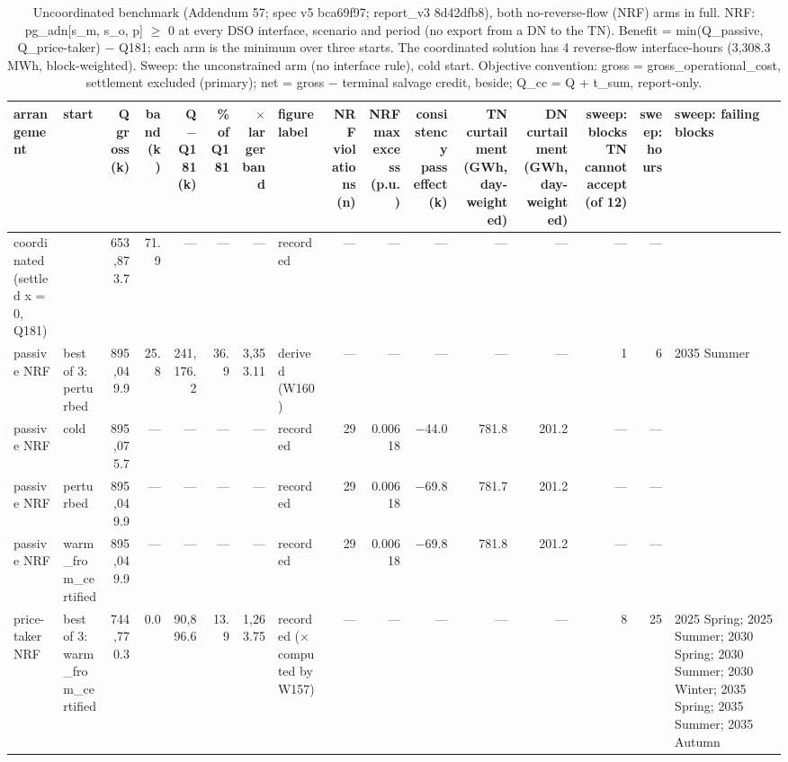 \begin{table}[htbp]
\centering
\scriptsize
\caption{Uncoordinated benchmark (Addendum 57; spec v5 bca69f97; report\_v3 8d42dfb8), both no-reverse-flow (NRF) arms in full. NRF: pg\_adn[s\_m, s\_o, p] $\geq$ 0 at every DSO interface, scenario and period (no export from a DN to the TN). Benefit = min(Q\_passive, Q\_price-taker) $-$ Q181; each arm is the minimum over three starts. The coordinated solution has 4 reverse-flow interface-hours (3,308.3 MWh, block-weighted). Sweep: the unconstrained arm (no interface rule), cold start. Objective convention: gross = gross\_operational\_cost, settlement excluded (primary); net = gross $-$ terminal salvage credit, beside; Q\_cc = Q + t\_sum, report-only.}
\label{tab:T6}
\begin{tabular}{llrrrrrlrrrrrrrl}
\toprule
arrangement & start & Q gross (k\texteuro{}) & band (k\texteuro{}) & Q $-$ Q181 (k\texteuro{}) & \% of Q181 & $\times$ larger band & figure label & NRF violations (n) & NRF max excess (p.u.) & consistency pass effect (k\texteuro{}) & TN curtailment (GWh, day-weighted) & DN curtailment (GWh, day-weighted) & sweep: blocks TN cannot accept (of 12) & sweep: hours & sweep: failing blocks \\
\midrule
coordinated (settled x = 0, Q181) &  & 653,873.7 & 71.9 & --- & --- & --- & recorded & --- & --- & --- & --- & --- & --- & --- &  \\
passive NRF & best of 3: perturbed & 895,049.9 & 25.8 & 241,176.2 & 36.9 & 3,353.11 & derived (W160) & --- & --- & --- & --- & --- & 1 & 6 & 2035 Summer \\
passive NRF & cold & 895,075.7 & --- & --- & --- & --- & recorded & 29 & 0.00618 & $-$44.0 & 781.8 & 201.2 & --- & --- &  \\
passive NRF & perturbed & 895,049.9 & --- & --- & --- & --- & recorded & 29 & 0.00618 & $-$69.8 & 781.7 & 201.2 & --- & --- &  \\
passive NRF & warm\_from\_certified & 895,049.9 & --- & --- & --- & --- & recorded & 29 & 0.00618 & $-$69.8 & 781.8 & 201.2 & --- & --- &  \\
price-taker NRF & best of 3: warm\_from\_certified & 744,770.3 & 0.0 & 90,896.6 & 13.9 & 1,263.75 & recorded ($\times$ computed by W157) & --- & --- & --- & --- & --- & 8 & 25 & 2025 Spring; 2025 Summer; 2030 Spring; 2030 Summer; 2030 Winter; 2035 Spring; 2035 Summer; 2035 Autumn \\

\end{tabular}
\end{table}
